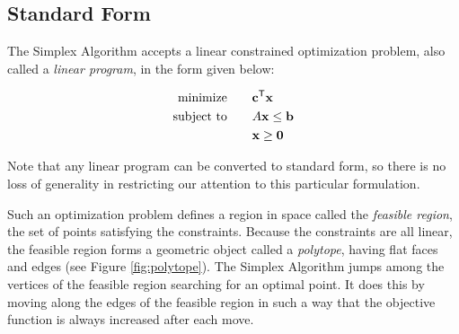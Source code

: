 
\subsection*{Standard Form} %

The Simplex Algorithm accepts a linear constrained optimization problem, also called a \emph{linear program}, in the form given below:

\begin{align*}
\mbox{minimize}\qquad &\mathbf{c}^{\mathsf T}\mathbf{x} \\
\mbox{subject to}\qquad & A\mathbf{x} \leq \mathbf{b} \\
 &\mathbf{x} \geq \mathbf{0}
\end{align*}

Note that any linear program can be converted to standard form, so there is no loss of generality in restricting our attention to this particular formulation.

Such an optimization problem defines a region in space called the \emph{feasible region}, the set of points satisfying the constraints.
Because the constraints are all linear, the feasible region forms a geometric object called a \emph{polytope}, having flat faces and edges (see Figure \ref{fig:polytope}).
The Simplex Algorithm jumps among the vertices of the feasible region searching for an optimal point.
It does this by moving along the edges of the feasible region in such a way that the objective function is always increased after each move.

